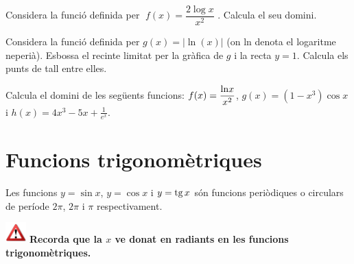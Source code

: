 \begin{mylist}

\exer Considera la funció definida per $\; f\left(x\right)=\dfrac{2\log x}{x^{2} } $ . Calcula el seu domini.

\exer Considera la funció definida per $g\left(x\right)=\left|\ln\left(x\right)\right|$ (on ln denota el logaritme neperià). Esbossa el recinte limitat per la gràfica de $g$ i la recta $y = 1$. Calcula els punts de tall entre elles.


\exer Calcula el domini de les següents funcions: $f(x)=\dfrac{{\rm \ln}x}{x^{2} }$, $g(x)=(1-x^{3} )\cos x$ i $h(x)=4x^{3} -5x+\frac{1}{e^{x} } $.


\end{mylist}
 

\section{Funcions trigonomètriques}

\begin{theorybox}
	Les funcions $y=\sin x$, $y=\cos x$ i $y=\mathrm{tg}\, x$ són funcions periòdiques o circulars de període $2\pi$, $2\pi$ i $\pi$ respectivament.
	
	\includegraphics[width=0.8cm]{img-05/warning} \textbf{ Recorda que la $x$ ve donat en radiants en les funcions trigonomètriques.} 
\end{theorybox}


